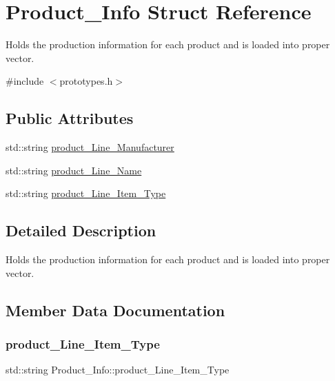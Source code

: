 \hypertarget{struct_product___info}{}\section{Product\+\_\+\+Info Struct Reference}
\label{struct_product___info}


Holds the production information for each product and is loaded into proper vector.  




{\ttfamily \#include $<$prototypes.\+h$>$}

\subsection*{Public Attributes}
\begin{DoxyCompactItemize}
\item 
std\+::string \mbox{\hyperlink{struct_product___info_af1b7675646f89dbc8f73b176085f4150}{product\+\_\+\+Line\+\_\+\+Manufacturer}}
\item 
std\+::string \mbox{\hyperlink{struct_product___info_aedcddaa42459b73298bd844a7ed45bdf}{product\+\_\+\+Line\+\_\+\+Name}}
\item 
std\+::string \mbox{\hyperlink{struct_product___info_a4db26e369bceba352e5a3c01c1f74391}{product\+\_\+\+Line\+\_\+\+Item\+\_\+\+Type}}
\end{DoxyCompactItemize}


\subsection{Detailed Description}
Holds the production information for each product and is loaded into proper vector. 

\subsection{Member Data Documentation}
\mbox{\label{struct_product___info_a4db26e369bceba352e5a3c01c1f74391}} 
\subsubsection{\texorpdfstring{product\_Line\_Item\_Type}{product\_Line\_Item\_Type}}
{\footnotesize\ttfamily std\+::string Product\+\_\+\+Info\+::product\+\_\+\+Line\+\_\+\+Item\+\_\+\+Type}

